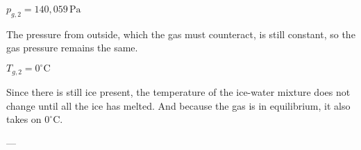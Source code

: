 \( p_{g,2} = 140,059 \, \text{Pa} \)  

The pressure from outside, which the gas must counteract, is still constant, so the gas pressure remains the same.  

\( T_{g,2} = 0^\circ \text{C} \)  

Since there is still ice present, the temperature of the ice-water mixture does not change until all the ice has melted. And because the gas is in equilibrium, it also takes on \( 0^\circ \text{C} \).  

---